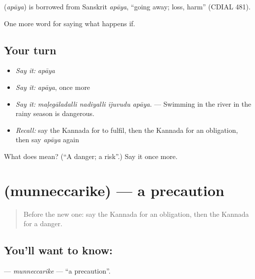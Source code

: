 \begin{cousinweb}
\textbf{} (\emph{apāya}) is borrowed from Sanskrit \emph{apāya}, \textquotedblleft{}going away; loss, harm\textquotedblright{} (CDIAL 481).
\end{cousinweb}

\begin{grammarlens}[title={What you've built}]
One more word for saying what happens if.
\end{grammarlens}

\subsection*{Your turn}
\begin{itemize}
\raggedright
  \item \emph{Say it:} \emph{apāya}
  \item \emph{Say it:} \emph{apāya}, once more
  \item \emph{Say it:} \emph{maḷegāladalli nadiyalli ījuvudu apāya.} — Swimming in the river in the rainy season is dangerous.
  \item \emph{Recall:} say the Kannada for to fulfil, then the Kannada for an obligation, then say \emph{apāya} again
\end{itemize}

\begin{tcolorbox}[breakable,colback=teal!4,colframe=teal!35!black,title={Before you move on}]
What does  mean? (\textquotedblleft{}A danger; a risk\textquotedblright{}.) Say it once more.
\end{tcolorbox}
\section[\texorpdfstring{\kn{ಮುನ್ನೆಚ್ಚರಿಕೆ} (munneccarike)}{ಮುನ್ನೆಚ್ಚರಿಕೆ (munneccarike)}]{ (munneccarike) — a precaution}

\label{lesson:KA-C412-munneccarike}



\begin{quote}
Before the new one: say the Kannada for an obligation, then the Kannada for a danger.
\end{quote}

\subsection*{You'll want to know: }
\textbf{} — \emph{munneccarike} — \textquotedblleft{}a precaution\textquotedblright{}.

